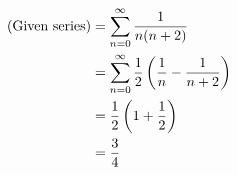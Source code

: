 \item

\begin{align*}
	(\text{Given series})
	 & = \sum_{n=0}^\infty \frac{1}{n(n + 2)}                                 \\
	 & = \sum_{n=0}^\infty \frac{1}{2} \left( \frac{1}{n} - \frac{1}{n + 2} \right) \\
	 & = \frac{1}{2} \left( 1 + \frac{1}{2} \right)                                       \\
	 & = \frac{3}{4}
\end{align*}
